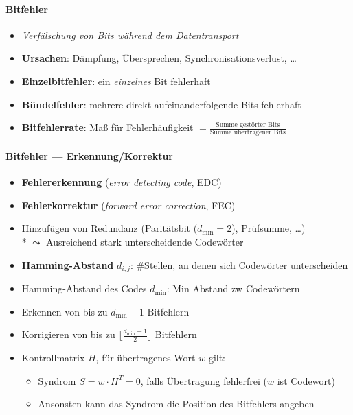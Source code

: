 \paragraph{Bitfehler}
\begin{itemize}
  \item \emph{Verfälschung von Bits während dem Datentransport}
  \item \textbf{Ursachen}: Dämpfung, Übersprechen, Synchronisationsverlust, \dots
  \item \textbf{Einzelbitfehler}: ein \emph{einzelnes} Bit fehlerhaft
  \item \textbf{Bündelfehler}: mehrere direkt aufeinanderfolgende Bits fehlerhaft
    \item \textbf{Bitfehlerrate}: Maß für Fehlerhäufigkeit \( = \tfrac{\text{Summe gestörter Bits}}{\text{Summe übertragener Bits}} \)
\end{itemize}

\paragraph{Bitfehler --- Erkennung/Korrektur}
\newcommand{\dmin}{\ensuremath{d_{\min}}}
\begin{itemize}
	\item \textbf{Fehlererkennung} (\emph{error detecting code}, EDC)
	\item \textbf{Fehlerkorrektur} (\emph{forward error correction}, FEC)
	\item Hinzufügen von Redundanz (Paritätsbit (\( \dmin = 2 \)), Prüfsumme, \dots) \\*
		\( \leadsto \) Ausreichend stark unterscheidende Codewörter 
	\item \textbf{Hamming-Abstand} \( d_{i,j} \): \#Stellen, an denen sich Codewörter unterscheiden
	\item Hamming-Abstand des Codes \( \dmin \): Min Abstand zw Codewörtern
	\item Erkennen von bis zu \( \dmin - 1 \) Bitfehlern
	\item Korrigieren von bis zu \( \lfloor \frac{\dmin - 1}{2} \rfloor \) Bitfehlern
	\item Kontrollmatrix \( H \), für übertragenes Wort \( w \) gilt:
	\begin{itemize}
    \item Syndrom \( S = w \cdot H^T = 0 \), falls Übertragung fehlerfrei (\( w \) ist Codewort)
    \item Ansonsten kann das Syndrom die Position des Bitfehlers angeben
  \end{itemize}
\end{itemize}

